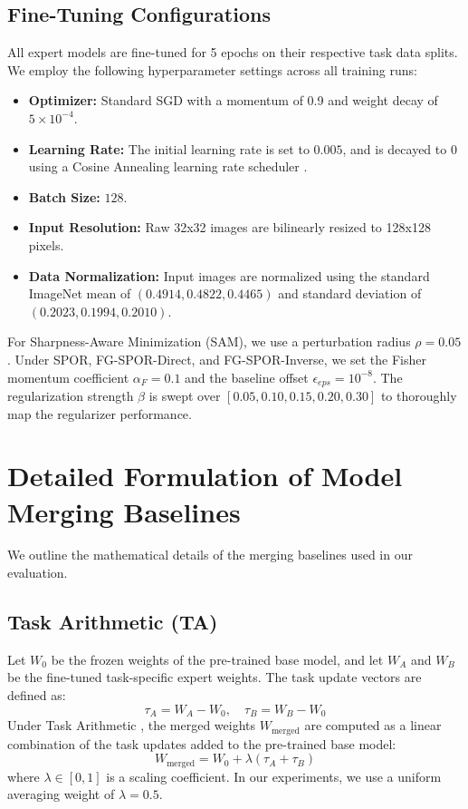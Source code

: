 \documentclass{article}
\theoremstyle{plain}
\theoremstyle{definition}
\theoremstyle{remark}
\begin{document}
\subsection{Fine-Tuning Configurations}
All expert models are fine-tuned for 5 epochs on their respective task data splits. We employ the following hyperparameter settings across all training runs:
\begin{itemize}
    \item \textbf{Optimizer:} Standard SGD with a momentum of 0.9 and weight decay of $5 \times 10^{-4}$.
    \item \textbf{Learning Rate:} The initial learning rate is set to $0.005$, and is decayed to 0 using a Cosine Annealing learning rate scheduler \cite{loshchilov2017decoupled}.
    \item \textbf{Batch Size:} $128$.
    \item \textbf{Input Resolution:} Raw 32x32 images are bilinearly resized to 128x128 pixels.
    \item \textbf{Data Normalization:} Input images are normalized using the standard ImageNet mean of $(0.4914, 0.4822, 0.4465)$ and standard deviation of $(0.2023, 0.1994, 0.2010)$.
\end{itemize}

For Sharpness-Aware Minimization (SAM), we use a perturbation radius $\rho = 0.05$. Under SPOR, FG-SPOR-Direct, and FG-SPOR-Inverse, we set the Fisher momentum coefficient $\alpha_F = 0.1$ and the baseline offset $\epsilon_{eps} = 10^{-8}$. The regularization strength $\beta$ is swept over $[0.05, 0.10, 0.15, 0.20, 0.30]$ to thoroughly map the regularizer performance.

\section{Detailed Formulation of Model Merging Baselines}
\label{app-merging-baselines}
We outline the mathematical details of the merging baselines used in our evaluation.

\subsection{Task Arithmetic (TA)}
Let $W_0$ be the frozen weights of the pre-trained base model, and let $W_A$ and $W_B$ be the fine-tuned task-specific expert weights. The task update vectors are defined as:
\begin{equation}
    \tau_A = W_A - W_0, \quad \tau_B = W_B - W_0
\end{equation}
Under Task Arithmetic \cite{ilharco2022editing}, the merged weights $W_{\text{merged}}$ are computed as a linear combination of the task updates added to the pre-trained base model:
\begin{equation}
    W_{\text{merged}} = W_0 + \lambda (\tau_A + \tau_B)
\end{equation}
where $\lambda \in [0, 1]$ is a scaling coefficient. In our experiments, we use a uniform averaging weight of $\lambda = 0.5$.
\end{document}

